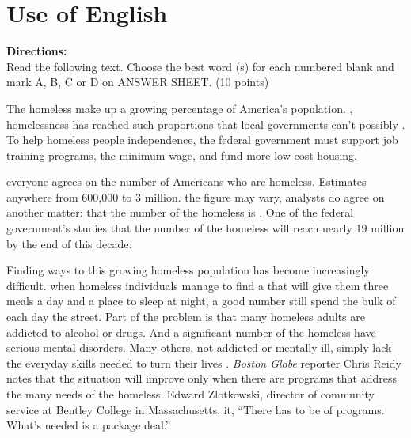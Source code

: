 


\section{Use of English}

\noindent
\textbf{Directions:}\\
Read the following text. Choose the best word (s) for each
	numbered blank and mark A, B, C or D on ANSWER
	SHEET. (10 points)


\TiGanSpace


The homeless make up a growing percentage of America's
population. \cloze , homelessness has reached such proportions
that local governments can't possibly \cloze. To help homeless
people \cloze independence, the federal government must support
job training programs, \cloze the minimum wage, and fund more
low-cost housing.

\cloze everyone agrees on the number of Americans who are
homeless. Estimates \cloze anywhere from 600,000 to 3
million. \cloze the figure may vary, analysts do agree on another
matter: that the number of the homeless is \cloze. One of the
federal government's studies \cloze that the number of the
homeless will reach nearly 19 million by the end of this decade.

Finding ways to \cloze this growing homeless population has
become increasingly difficult. \cloze when homeless individuals
manage to find a \cloze that will give them three meals a day
and a place to sleep at night, a good number still spend the bulk of
each day \cloze the street. Part of the problem is that many
homeless adults are addicted to alcohol or drugs. And a significant
number of the homeless have serious mental disorders. Many
others, \cloze not addicted or mentally ill, simply lack the
everyday \cloze skills needed to turn their
lives \cloze. \emph{Boston Globe} reporter Chris Reidy notes
that the situation will improve only when there
are \cloze programs that address the many needs of the
homeless. \cloze Edward Zlotkowski, director of community
service at Bentley College in Massachusetts, \cloze it, ``There
has to be \cloze of programs. What's needed is a package deal.''


